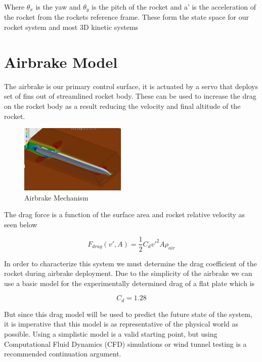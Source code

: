 \documentclass[conference, letterpaper]{IEEEtran}
\begin{document}
Where $\theta_x$ is the yaw and $\theta_y$ is the pitch of the rocket and a' is the acceleration of the rocket
from the rockets reference frame. These form the state space for our rocket system and most 3D kinetic systems

\section{Airbrake Model}
The airbrake is our primary control surface, it is actuated by a servo that deploys
set of fins out of streamlined rocket body.  These can be used to increase the drag on
the rocket body as a result reducing the velocity and final altitude of the rocket.

\begin{figure}[H]
\centering
\includegraphics[width=0.45\textwidth]{./airbrake_mechanism}
\caption{Airbrake Mechanism}
\label{fig:airbrake_mechanism}
\end{figure}

The drag force is a function of the surface area and rocket relative velocity as seen below

\begin{equation}\label{eq:3}
  F_{drag}(v', A)=\frac{1}{2}C_dv'^2A\rho_{air}
\end{equation}

In order to characterize this system we must determine the drag coefficient of the rocket
during airbrake deployment. Due to the simplicity of the airbrake we can use a basic
model for the experimentally determined drag of a flat plate\citep{nasa} which is

\begin{equation}\label{eq:4}
  C_d=1.28
\end{equation}

But since this drag model will be used to predict the future state of the system, it is
imperative that this model is as representative of the physical world as possible.  Using
a simplistic model is a valid starting point, but using Computational Fluid Dynamics (CFD)
simulations or wind tunnel testing is a recommended continuation argument.
\end{document}
